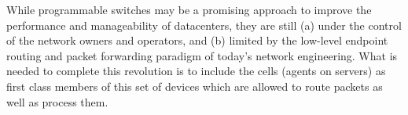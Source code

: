 \documentclass[../../../OAE-SPEC-MAIN.tex]{subfiles}
\begin{document}
%
%
%

While programmable switches may be a promising approach to improve the performance and manageability of datacenters, they are still (a)  under the control of the network owners and operators, and (b) limited by the low-level endpoint routing and packet forwarding paradigm of today's network engineering. What is needed to complete this revolution is to include the cells (agents on servers) as first class members of this set of devices which are allowed to route packets as well as process them.
\end{document}
